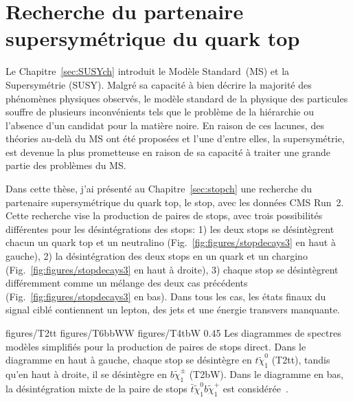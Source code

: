 \section{Recherche du partenaire supersymétrique du quark top}

Le Chapitre~\ref{sec:SUSYch} introduit le Modèle Standard~(MS) et la Supersymétrie (SUSY). Malgré sa capacité à bien décrire la majorité des phénomènes physiques observés, le modèle standard de la physique des particules souffre de plusieurs inconvénients tels que le problème de la hiérarchie ou l’absence d’un candidat pour la matière noire. En raison de ces lacunes, des théories au-delà du MS ont été proposées et l'une d'entre elles, la supersymétrie, est devenue la plus prometteuse en raison de sa capacité à traiter une grande partie des problèmes du MS. 

Dans cette thèse, j'ai présenté au Chapitre~\ref{sec:stopch} une recherche du partenaire supersymétrique du quark top, le stop, avec les données CMS Run~2. Cette recherche vise la production de paires de stops, avec trois possibilités différentes pour les désintégrations des stops: 1) les deux stops se désintègrent chacun un quark top et un neutralino (Fig.~\ref{fig:figures/stopdecays3} en haut à gauche), 2) la désintégration des deux stops en un quark et un chargino (Fig.~\ref{fig:figures/stopdecays3} en haut à droite), 3) chaque stop se désintègrent différemment comme un mélange des deux cas précédents (Fig.~\ref{fig:figures/stopdecays3} en bas). Dans tous les cas, les états finaux du signal ciblé contiennent un lepton, des jets et une énergie transvers manquante.

                 {figures/T2tt} %
                 {figures/T6bbWW} %
                 {figures/T4tbW}
                 {0.45}       %
                 { Les diagrammes de spectres modèles simplifiés pour la production de paires de stops direct. Dans le diagramme en haut à gauche, chaque stop se désintègre en $t  \tilde{\chi}^{0}_{1}$ (T2tt), tandis qu'en haut à droite, il se désintègre en $ b \tilde{\chi}^{\pm}_{1} $ (T2bW). Dans le diagramme en bas, la désintégration mixte de la paire de stops $\bar{t} \tilde{\chi}^{0}_{1} b \tilde{\chi}^{+}_{1}$ est considérée~\cite{website:SUSYdiagrams}. }


